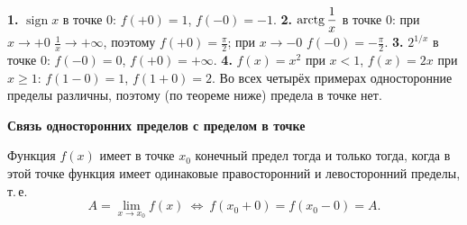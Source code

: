 \documentclass[a4paper,11pt]{article}
\newcommand{\podr}[1]{\par\needspace{8\baselineskip}\medskip
  {\large\bfseries\textcolor{oprc!80!black}{#1}}\par\nopagebreak\smallskip}
\begin{document}
\begin{dop}
\textbf{1.} $\operatorname{sign} x$ в точке $0$: $f(+0) = 1$, $f(-0) = -1$.
\textbf{2.} $\operatorname{arctg}\dfrac1x$ в точке $0$: при $x \to +0$ $\frac1x \to +\infty$, поэтому $f(+0) = \frac\pi2$; при $x \to -0$ $f(-0) = -\frac\pi2$.
\textbf{3.} $2^{1/x}$ в точке $0$: $f(-0) = 0$, $f(+0) = +\infty$.
\textbf{4.} $f(x) = x^2$ при $x < 1$, $f(x) = 2x$ при $x \ge 1$: $f(1 - 0) = 1$, $f(1 + 0) = 2$.
Во всех четырёх примерах односторонние пределы различны, поэтому (по теореме ниже) предела в точке нет.
\end{dop}

\podr{Связь односторонних пределов с пределом в точке}

\begin{teo}
Функция $f(x)$ имеет в точке $x_0$ конечный предел тогда и только тогда, когда в этой точке функция имеет одинаковые
правосторонний и левосторонний пределы, т.\,е.
\[
  A = \lim_{x \to x_0} f(x) \ \Longleftrightarrow\ f(x_0 + 0) = f(x_0 - 0) = A.
\]
\end{teo}

\begin{center}
\end{center}
\end{document}
